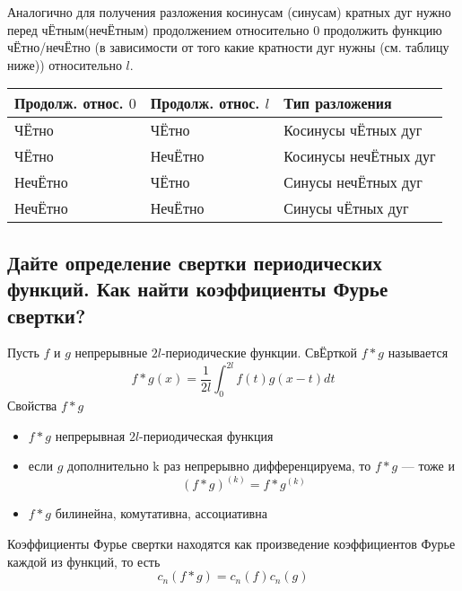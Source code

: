 \documentclass{article}
\begin{document}
Аналогично для получения разложения косинусам (синусам) кратных дуг нужно перед ч{\footnotesize Ё}тным(неч{\footnotesize Ё}тным) продолжением относительно 0 продолжить функцию ч{\footnotesize Ё}тно/неч{\footnotesize Ё}тно (в зависимости от того какие кратности дуг нужны (см. таблицу ниже)) относительно $l$.

\begin{table}[h]
	\begin{tabular}{|l|l|l|}
		\hline
		Продолж. относ. $0$     	 & Продолж. относ. $l$ 	& Тип разложения        \\ \hline
		Ч{\footnotesize Ё}тно                        & Ч{\footnotesize Ё}тно                        & Косинусы ч{\footnotesize Ё}тных дуг   \\ \hline
		Ч{\footnotesize Ё}тно                        & Неч{\footnotesize Ё}тно                      & Косинусы неч{\footnotesize Ё}тных дуг \\ \hline
		Неч{\footnotesize Ё}тно                      & Ч{\footnotesize Ё}тно                        & Синусы неч{\footnotesize Ё}тных дуг     \\ \hline
		Неч{\footnotesize Ё}тно                      & Неч{\footnotesize Ё}тно                      & Синусы ч{\footnotesize Ё}тных дуг   \\ \hline
	\end{tabular}
\end{table}




\subsection{Дайте определение свертки периодических функций. Как найти коэффициенты Фурье свертки?}
Пусть $f$ и $g$ непрерывные $2l$-периодические функции. Св{\footnotesize Ё}рткой $f*g$ называется 
\[f*g(x) = \frac{1}{2l}\int_0^{2l}f(t)g(x-t)dt\]
Свойства $f*g$
\begin{itemize}
	\item
	$f*g$ непрерывная $2l$-периодическая функция
	\item
	если $g$ дополнительно k раз непрерывно дифференцируема, то $f*g$ --- тоже и 
	\[(f*g)^{(k)} = f*g^{(k)}\]
	\item
	$f*g$ билинейна, комутативна, ассоциативна
\end{itemize}

Коэффициенты Фурье свертки находятся как произведение коэффициентов Фурье каждой из функций, то есть
\[c_n(f*g)=c_n(f)c_n(g)\]
\end{document}
